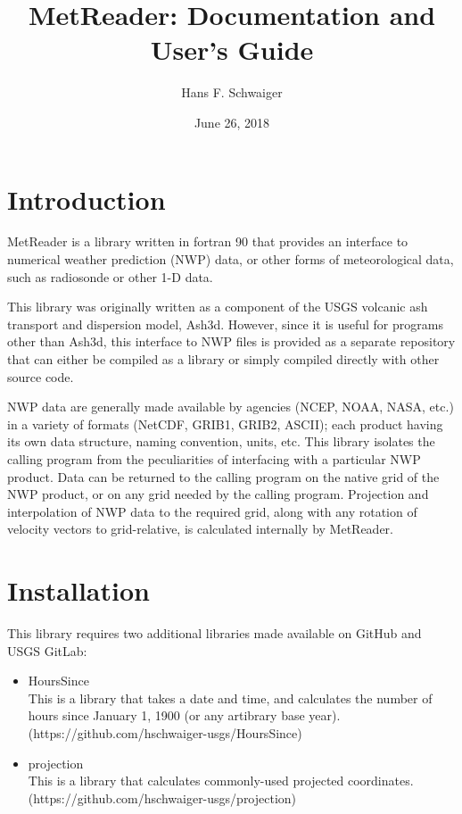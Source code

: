 \documentclass[11pt]{article}   %
\begin{document}
\title{MetReader: Documentation and User's Guide}   %
\author{Hans F. Schwaiger}
\date{June 26, 2018}    %
\maketitle

\section{Introduction}
MetReader is a library written in fortran 90 that provides an interface to
numerical weather prediction (NWP) data, or other forms of meteorological
data, such as radiosonde or other 1-D data.

This library was originally written as a component of the USGS volcanic ash
transport and dispersion model, Ash3d.  However, since it is useful for
programs other than Ash3d, this interface to NWP files is provided
as a separate repository that can either be compiled as a library or simply
compiled directly with other source code.

NWP data are generally made available by agencies (NCEP, NOAA, NASA, etc.)
in a variety of formats (NetCDF, GRIB1, GRIB2, ASCII); each product having
its own data structure, naming convention, units, etc.  This library
isolates the calling program from the peculiarities of interfacing with
a particular NWP product.  Data can be returned to the calling program on
the native grid of the NWP product, or on any grid needed by the calling
program.  Projection and interpolation of NWP data to the required grid, along
with any rotation of velocity vectors to grid-relative, is calculated internally by
MetReader.

\section{Installation}
This library requires two additional libraries made available on GitHub and USGS GitLab:
\begin{itemize}
\item HoursSince \\
This is a library that takes a date and time, and calculates the number of hours
since January 1, 1900 (or any artibrary base year).\\
(https://github.com/hschwaiger-usgs/HoursSince)
\item projection \\
This is a library that calculates commonly-used projected coordinates.\\
(https://github.com/hschwaiger-usgs/projection)
\end{itemize}
\end{document}
